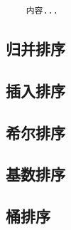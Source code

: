 \begin{lstlisting}
	内容...
\end{lstlisting}

\subsection{归并排序}
\subsection{插入排序}
\subsection{希尔排序}
\subsection{基数排序}
\subsection{桶排序}

